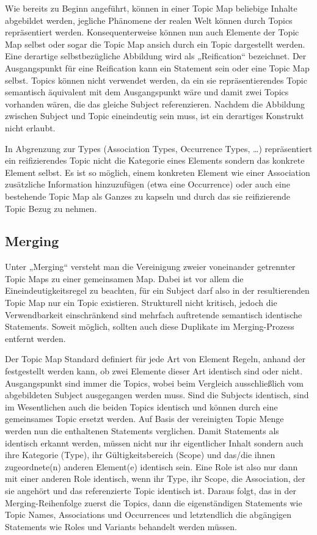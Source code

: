 Wie bereits zu Beginn angeführt, können in einer Topic Map beliebige Inhalte abgebildet werden, jegliche Phänomene der realen Welt können durch Topics repräsentiert werden. Konsequenterweise können nun auch Elemente der Topic Map selbst oder sogar die Topic Map ansich durch ein Topic dargestellt werden. Eine derartige selbstbezügliche Abbildung wird als „Reification“ bezeichnet. Der Ausgangspunkt für eine Reification kann ein Statement sein oder eine Topic Map selbst. Topics können nicht verwendet werden, da ein sie repräsentierendes Topic semantisch äquivalent mit dem Ausgangspunkt wäre und damit zwei Topics vorhanden wären, die das gleiche Subject referenzieren. Nachdem die Abbildung zwischen Subject und Topic eineindeutig sein muss, ist ein derartiges Konstrukt nicht erlaubt.

In Abgrenzung zur Types (Association Types, Occurrence Types, \ldots) repräsentiert ein reifizierendes Topic nicht die Kategorie eines Elements sondern das konkrete Element selbst. Es ist so möglich, einem konkreten Element wie einer Association zusätzliche Information hinzuzufügen (etwa eine Occurrence) oder auch eine bestehende Topic Map als Ganzes zu kapseln und durch das sie reifizierende Topic Bezug zu nehmen. 


\subsection{Merging} %
\label{ssub:merging}

Unter „Merging“ versteht man die Vereinigung zweier voneinander getrennter Topic Maps zu einer gemeinsamen Map. Dabei ist vor allem die Eineindeutigkeitsregel zu beachten, für ein Subject darf also in der resultierenden Topic Map nur ein Topic existieren. Strukturell nicht kritisch, jedoch die Verwendbarkeit einschränkend sind mehrfach auftretende semantisch identische Statements. Soweit möglich, sollten auch diese Duplikate im Merging-Prozess entfernt werden.

Der Topic Map Standard definiert für jede Art von Element Regeln, anhand der festgestellt werden kann, ob zwei Elemente dieser Art identisch sind oder nicht. Ausgangspunkt sind immer die Topics, wobei beim Vergleich ausschließlich vom abgebildeten Subject ausgegangen werden muss. Sind die Subjects identisch, sind im Wesentlichen auch die beiden Topics identisch und können durch eine gemeinsames Topic ersetzt werden. Auf Basis der vereinigten Topic Menge werden nun die enthaltenen Statements verglichen. Damit Statements als identisch erkannt werden, müssen nicht nur ihr eigentlicher Inhalt sondern auch ihre Kategorie (Type), ihr Gültigkeitsbereich (Scope) und das/die ihnen zugeordnete(n) anderen Element(e) identisch sein. Eine Role ist also nur dann mit einer anderen Role identisch, wenn ihr Type, ihr Scope, die Association, der sie angehört und das referenzierte Topic identisch ist. Daraus folgt, das in der Merging-Reihenfolge zuerst die Topics, dann die eigenständigen Statements wie Topic Names, Associations und Occurrences und letztendlich die abgängigen Statements wie Roles und Variants behandelt werden müssen.

